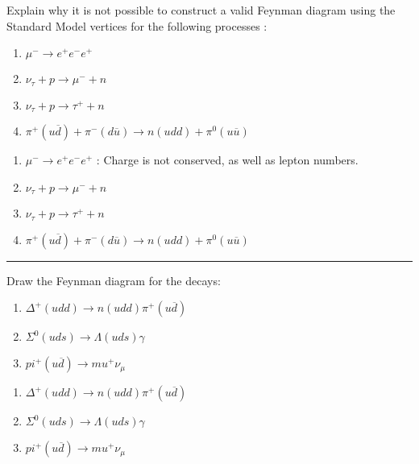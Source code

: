 
\begin{problem}{1.3}
Explain why it is not possible to construct a valid Feynman diagram using the Standard Model vertices for the following processes :
\begin{enumerate}[label=(\alph*)]
    \item $\mu^- \to e^+e^-e^+$
    \item $\nu_\tau + p \to \mu^- + n$
    \item $\nu_\tau + p \to \tau^+ + n$
    \item $\pi^+(u\overbar{d})+\pi^-(d\overbar{u}) \to n(udd) + \pi^0(u\overbar{u})$
\end{enumerate}
\end{problem}
\begin{solution}
\begin{enumerate}[label=(\alph*)]
    \item $\mu^- \to e^+e^-e^+$ : Charge is not conserved, as well as lepton numbers.
    \item $\nu_\tau + p \to \mu^- + n$
    \item $\nu_\tau + p \to \tau^+ + n$
    \item $\pi^+(u\overbar{d})+\pi^-(d\overbar{u}) \to n(udd) + \pi^0(u\overbar{u})$
\end{enumerate}
\end{solution}

\noindent\rule{7in}{1.5pt}


\begin{problem}{1.4}
Draw the Feynman diagram for the decays:
\begin{enumerate}[label=(\alph*)]
    \item $\Delta^+(udd)\to n(udd)\pi^+(u\overbar{d})$
    \item $\Sigma^0(uds)\to\Lambda(uds)\gamma$
    \item $pi^+(u\overbar{d})\to mu^+ \nu_\mu$
\end{enumerate}
\end{problem}
\begin{solution}
\begin{enumerate}[label=(\alph*)]
    \item $\Delta^+(udd)\to n(udd)\pi^+(u\overbar{d})$
    \item $\Sigma^0(uds)\to\Lambda(uds)\gamma$
    \item $pi^+(u\overbar{d})\to mu^+ \nu_\mu$
\end{enumerate}
\end{solution}

